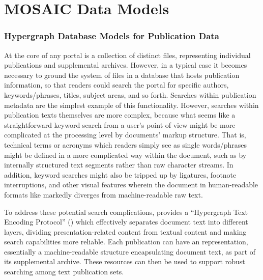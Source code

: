 \documentclass[11pt,letterpaper]{article}
\let\OldPart\part
\renewcommand{\part}[1]{\OldPart{#1}%
\vspace{-.5em}}
\newcommand{\HTXN}{\resizebox{!}{7pt}{\ATexttclr{HTXN}}}
\newcommand{\ATexttclr}[1]{\textcolor{tcolor}{\textbf{#1}}}
\newcommand{\lMOSAIC}{%
\resizebox{!}{8pt}{\ATexttclr{M}}%
\resizebox{!}{6pt}{\ATexttclr{OSAIC}}}
\newcommand{\textscc}[1]{{\color{orr!35!black}{{%
						\fontfamily{Cabin-TLF}\fontseries{b}\selectfont{\textsc{\scriptsize{#1}}}}}}}
\newcommand{\AcronymText}[1]{{\textscc{#1}}}
\newcommand{\MOSAIC}{\resizebox{!}{7pt}{\ATexttclr{MOSAIC}}}
\newcommand{\PDF}{\resizebox{!}{7pt}{\AcronymText{PDF}}}
\newcommand{\p}[1]{

\vspace{.9em}#1}
\newcommand{\q}[1]{{\fontfamily{qcr}\selectfont ``}#1{\fontfamily{qcr}\selectfont ''}}
\begin{document}
{%

\vspace{-9pt}
\part{MOSAIC Data Models}
\vspace{-6pt}
\section{Hypergraph Database Models for Publication Data}
\p{At the core of any \MOSAIC{} portal is a collection of 
distinct files, representing individual publications and 
supplemental archives.  However, in a typical case it 
becomes necessary to ground the system of files in a 
database that hosts publication information, so that 
readers could search the portal for specific authors, 
keywords/phrases, titles, subject areas, and so forth.  
Searches within publication metadata are the simplest 
example of this functionality.  However, searches within publication 
texts themselves are more complex, because what seems like a 
straightforward keyword search from a user's point of 
view might be more complicated at the processing level by 
documents' markup structure.  That is, technical terms or acronyms 
which readers simply see as single words/phrases might be 
defined in a more complicated way within the document, 
such as by internally structured text 
segments rather than raw character streams.  In addition, 
keyword searches might also be tripped up by 
ligatures, footnote interruptions, and 
other visual features wherein the document in human-readable 
formats like \PDF{} markedly diverges  
from machine-readable raw text.}

\p{To address these potential search complications, \MOSAIC{} 
provides a \q{Hypergraph Text Encoding Protocol} (\HTXN{}) 
which effectively separates document text into different layers, 
dividing presentation-related content from textual content and 
making search capabilities more reliable.  Each publication can have 
an \HTXN{} representation, essentially a machine-readable structure 
encapsulating document text, as part of its supplemental archive.  
These \HTXN{} resources can then be used to support 
robust searching among text publication sets.}

}
\end{document}
